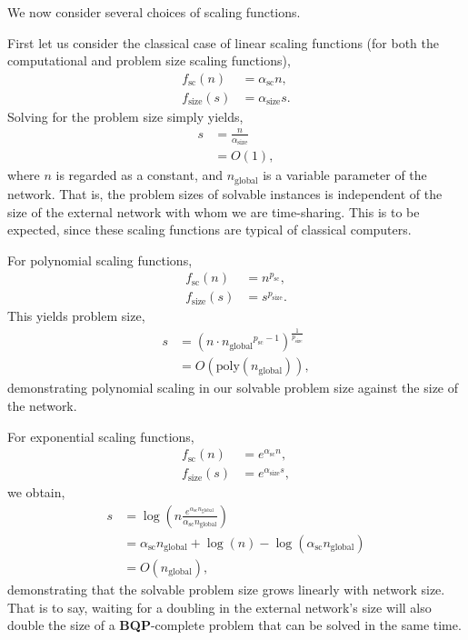 We now consider several choices of scaling functions.

First let us consider the classical case of linear scaling functions (for both the computational and problem size scaling functions),
\begin{align}
	f_\mathrm{sc}(n) &= \alpha_\mathrm{sc} n,\nonumber\\
	f_\mathrm{size}(s) &= \alpha_\mathrm{size} s.
\end{align}
Solving for the problem size simply yields,
\begin{align}
s &= \frac{n}{\alpha_\mathrm{size}} \nonumber\\
&= O(1),
\end{align}
where $n$ is regarded as a constant, and $n_\mathrm{global}$ is a variable parameter of the network. That is, the problem sizes of solvable instances is independent of the size of the external network with whom we are time-sharing. This is to be expected, since these scaling functions are typical of classical computers.

For polynomial scaling functions,
\begin{align}
f_\mathrm{sc}(n) &= n^{p_\mathrm{sc}},\nonumber\\
f_\mathrm{size}(s) &= s^{p_\mathrm{size}}.
\end{align}
This yields problem size,
\begin{align}
	s &= (n \cdot {n_\mathrm{global}}^{p_\mathrm{sc}-1})^\frac{1}{p_\mathrm{size}} \nonumber\\
	&= O(\mathrm{poly}(n_\mathrm{global})),
\end{align}
demonstrating polynomial scaling in our solvable problem size against the size of the network.

For exponential scaling functions,
\begin{align}
f_\mathrm{sc}(n) &= e^{\alpha_\mathrm{sc}n},\nonumber\\
f_\mathrm{size}(s) &= e^{\alpha_\mathrm{size}s},
\end{align}
we obtain,
\begin{align}
s &= \log\left(n \frac{e^{\alpha_\mathrm{sc}n_\mathrm{global}}}{\alpha_\mathrm{sc}n_\mathrm{global}}\right) \nonumber\\
&= \alpha_\mathrm{sc}n_\mathrm{global} + \log(n)-\log(\alpha_\mathrm{sc}n_\mathrm{global}) \nonumber\\
&= O(n_\mathrm{global}),
\end{align}
demonstrating that the solvable problem size grows linearly with network size. That is to say, waiting for a doubling in the external network's size will also double the size of a \textbf{BQP}-complete problem that can be solved in the same time.

